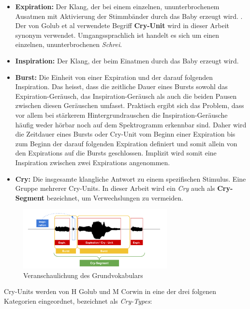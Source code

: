 \begin{itemize}
	 \item \textbf{Expiration:} Der Klang, der bei einem einzelnen, ununterbrochenem Ausatmen mit Aktivierung der Stimmbänder durch das Baby erzeugt wird. \cite{rythmic}. Der von Golub et al \cite[S. 61]{cryModel} verwendete Begriff \textbf{Cry-Unit} wird in dieser Arbeit synonym verwendet. Umgangssprachlich ist handelt es sich um einen einzelnen, ununterbrochenen \emph{Schrei}.
	\item \textbf{Inspiration:} Der Klang, der beim Einatmen durch das Baby erzeugt wird.
	\item  \textbf{Burst:} Die Einheit von einer Expiration und der darauf folgenden Inspiration. Das heisst, dass die zeitliche Dauer eines Bursts sowohl das Expiration-Geräusch, das Inspiration-Geräusch als auch die beiden Pausen zwischen diesen Geräuschen umfasst. Praktisch ergibt sich das Problem, dass vor allem bei stärkerem Hintergrundrauschen die Inspiration-Geräusche häufig weder hörbar noch auf dem Spektrogramm erkennbar sind. Daher wird die Zeitdauer eines Bursts oder Cry-Unit vom Beginn einer Expiration bis zum Beginn der darauf folgenden Expiration definiert und somit allein von den Expirations auf die Bursts geschlossen. Implizit wird somit eine Inspiration zwischen zwei Expirations angenommen.
	\item  \textbf{Cry:} Die insgesamte klangliche Antwort zu einem spezifischen Stimulus. Eine Gruppe mehrerer Cry-Units.\cite[S. 61]{cryModel} In dieser Arbeit wird ein \emph{Cry} auch als \textbf{Cry-Segment} bezeichnet, um Verwechslungen zu vermeiden.
\end{itemize}

\begin{figure}
	\centering
	\includegraphics[width=0.7\textwidth]{bilder/cryVoc02.png}
	\caption{Veranschaulichung des Grundvokabulars}
	\label{img:cryVocabulary}
\end{figure}

Cry-Units werden von H Golub und M Corwin in eine der drei folgenen Kategorien eingeordnet, bezeichnet als \emph{Cry-Types}: \cite[S. 61 - 62]{cryModel}


